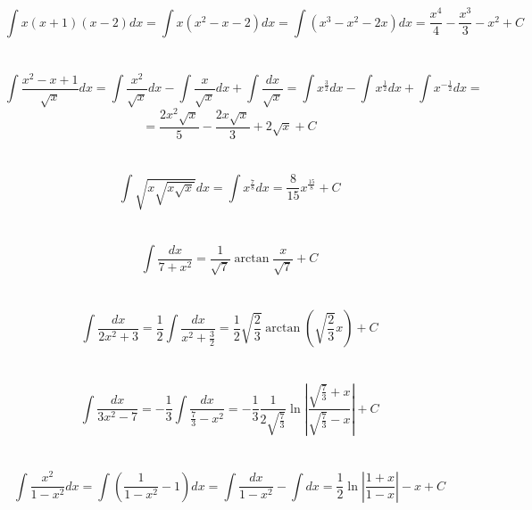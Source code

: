 \section{}
    \[\int x(x + 1)(x - 2)dx = \int x(x^2 - x - 2)dx =
    \int (x^3 - x^2 - 2x)dx = \frac{x^4}{4} - \frac{x^3}{3} - x^2 + C\]

\section{}
    \[\int \frac{x^2-x+1}{\sqrt{x}}dx = \int \frac{x^2}{\sqrt{x}}dx -
    \int \frac{x}{\sqrt{x}}dx + \int \frac{dx}{\sqrt{x}} =
    \int x^{\frac{3}{2}}dx - \int x^{\frac{1}{2}}dx +
    \int x^{-\frac{1}{2}}dx = \] 
    \[= \frac{2x^2 \sqrt{x}}{5} - \frac{2x \sqrt{x}}{3} + 2 \sqrt{x} + C\]    
    
\section{}
    \[\int \sqrt{x \sqrt{x \sqrt{x}}}dx = \int x^{\frac{7}{8}}dx =
    \frac{8}{15} x^{\frac{15}{8}} + C\]
            
\section{}
    \[\int \frac{dx}{7 + x^2} = \frac{1}{\sqrt{7}}
    \arctan{\frac{x}{\sqrt{7}}} + C\]
            
\section{}
    \[\int \frac{dx}{2x^2 + 3} = \frac{1}{2} \int
    \frac{dx}{x^2 + \frac{3}{2}} = \frac{1}{2} \sqrt{\frac{2}{3}}
    \arctan{\left(\sqrt{\frac{2}{3}}x\right)} + C\]
            
\section{}
    \[\int \frac{dx}{3x^2 - 7} = - \frac{1}{3}
    \int \frac{dx}{\frac{7}{3} - x^2} = - \frac{1}{3}
    \frac{1}{2 \sqrt{\frac{7}{3}}} \ln{\left|
    \frac{\sqrt{\frac{7}{3}} + x}{\sqrt{\frac{7}{3}} - x} \right|} + C\]    
    
\section{}
    \[\int \frac{x^2}{1 - x^2}dx = \int \left(\frac{1}{1-x^2} - 1
    \right)dx = \int \frac{dx}{1 - x^2} - \int dx = 
    \frac{1}{2} \ln{\left| \frac{1 + x}{1 - x} \right|} - x + C\]


